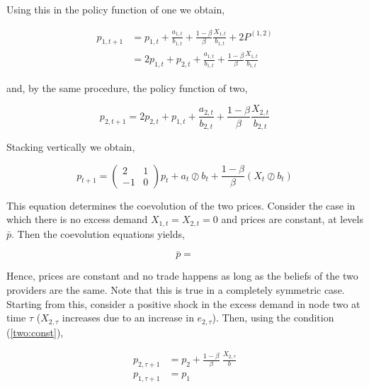 Using this in the policy function of one we obtain,

\begin{equation*}
  \begin{split}
    p_{1, t+1} &= p_{1, t} + \frac{a_{1, t}}{b_{1, t}} + \frac{1 - \beta}{\beta} \frac{X_{1, t}}{b_{1, t}} + 2P^{(1, 2)} \\
    &= 2p_{1, t} + p_{2, t} + \frac{a_{1, t}}{b_{1, t}} + \frac{1 - \beta}{\beta} \frac{X_{1, t}}{b_{1, t}}
  \end{split}
\end{equation*}

and, by the same procedure, the policy function of two,

\begin{equation*}
  p_{2, t+1} = 2 p_{2, t} +  p_{1, t} + \frac{a_{2, t}}{b_{2, t}} + \frac{1 - \beta}{\beta} \frac{X_{2, t}}{b_{2, t}}
\end{equation*}

Stacking vertically we obtain,

\begin{equation}
  p_{t+1} = \begin{pmatrix}
    2  & 1 \\
    -1 & 0
  \end{pmatrix} p_t + a_t \oslash b_t + \frac{1 - \beta}{\beta} \left( X_t \oslash b_t \right)
\end{equation}

This equation determines the coevolution of the two prices. Consider the case in which there is no excess demand $X_{1, t} = X_{2, t} = 0$ and prices are constant, at levels $\bar{p}$. Then the coevolution equations yields,

\begin{equation} \label{two:const}
  \bar{p} =
\end{equation}

Hence, prices are constant and no trade happens as long as the beliefs of the two providers are the same. Note that this is true in a completely symmetric case. Starting from this, consider a positive shock in the excess demand in node two at time $\tau$ ($X_{2, \tau}$ increases due to an increase in $e_{2, \tau}$). Then, using the condition (\ref{two:const}),

\begin{equation}
  \begin{split}
    p_{2, \tau + 1} &= p_2 + \frac{1 - \beta}{\beta} \  \frac{X_{2, \tau}}{b} \\
    p_{1, \tau + 1} &= p_1
  \end{split}
\end{equation}



